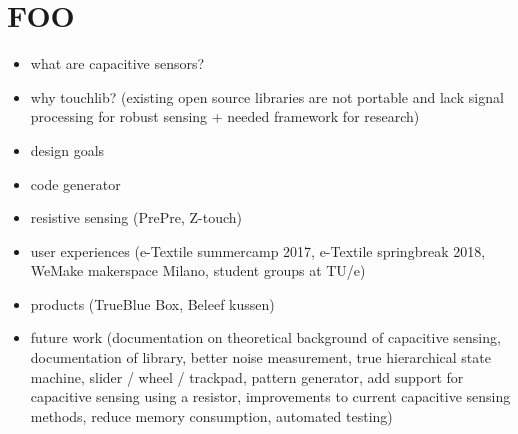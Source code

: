 \documentclass[format=sigchi, screen=true, review=true]{acmart}
\begin{document}
\section{FOO}

\begin{itemize}
\item what are capacitive sensors?
\item why touchlib? (existing open source libraries are not portable and lack signal processing for robust sensing + needed framework for research)
\item design goals
\item code generator
\item resistive sensing (PrePre, Z-touch)
\item user experiences (e-Textile summercamp 2017, e-Textile springbreak 2018, WeMake makerspace Milano, student groups at TU/e)
\item products (TrueBlue Box, Beleef kussen)
\item future work (documentation on theoretical background of capacitive sensing, documentation of library, better noise measurement, true hierarchical state machine, slider / wheel / trackpad, pattern generator, add support for capacitive sensing using a resistor, improvements to current capacitive sensing methods, reduce memory consumption, automated testing)
\end{itemize}
\end{document}
